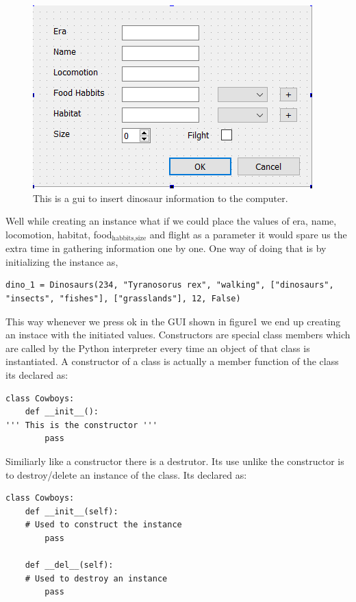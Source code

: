 \documentclass[11pt]{article}
\begin{document}
\begin{figure}[htbp]
\centering
\includegraphics[width=.9\linewidth]{./img/dino_gui.png}
\caption{\label{fig:orgaff86e5}
This is a gui to insert dinosaur information to the computer.}
\end{figure}

Well while creating an instance what if we could place the values of era, name, locomotion, habitat, food\(_{\text{habbits,size}}\) and flight as a parameter it would spare us the extra time in gathering information one by one. One way of doing that is by initializing the instance as,

\begin{verbatim}
dino_1 = Dinosaurs(234, "Tyranosorus rex", "walking", ["dinosaurs", "insects", "fishes"], ["grasslands"], 12, False) 
\end{verbatim}

This way whenever we press ok in the GUI shown in figure1 we end up creating an instace with the initiated values. Constructors are special class members which are called by the Python interpreter every time an object of that class is instantiated. A constructor of a class is actually a member function of the class its declared as: 
\begin{verbatim}
class Cowboys:
    def __init__():
''' This is the constructor '''
        pass
\end{verbatim}
Similiarly like a constructor there is a destrutor. Its use unlike the constructor is to destroy/delete an instance of the class. Its declared as:
\begin{verbatim}
class Cowboys:
    def __init__(self):
    # Used to construct the instance
        pass

    def __del__(self):
    # Used to destroy an instance
        pass
\end{verbatim}
\end{document}

